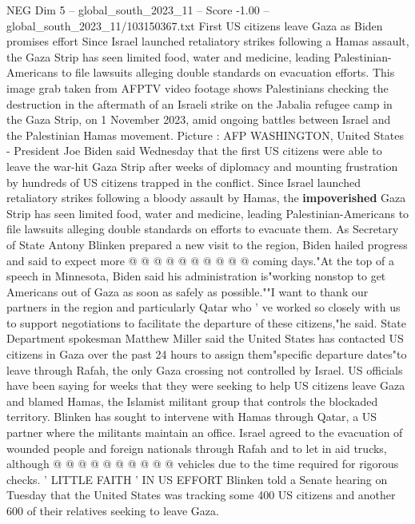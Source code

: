 \begin{textsample}{NEG Dim 5 – global\_south\_2023\_11 – Score -1.00 – global\_south\_2023\_11/103150367.txt}  \label{ex:f5_neg_203}
First US citizens leave Gaza as Biden promises effort Since Israel launched retaliatory strikes following a Hamas assault, the Gaza Strip has seen limited food, water and medicine, leading Palestinian-Americans to file lawsuits alleging double standards on evacuation efforts.
This image grab taken from AFPTV video footage shows Palestinians checking the destruction in the aftermath of an Israeli strike on the Jabalia refugee camp in the Gaza Strip, on 1 November 2023, amid ongoing battles between Israel and the Palestinian Hamas movement.
Picture : AFP WASHINGTON, United States - President Joe Biden said Wednesday that the first US citizens were able to leave the war-hit Gaza Strip after weeks of diplomacy and mounting frustration by hundreds of US citizens trapped in the conflict.
Since Israel launched retaliatory strikes following a bloody assault by Hamas, the \textbf{impoverished} Gaza Strip has seen limited food, water and medicine, leading Palestinian-Americans to file lawsuits alleging double standards on efforts to evacuate them.
As Secretary of State Antony Blinken prepared a new visit to the region, Biden hailed progress and said to expect more @ @ @ @ @ @ @ @ @ @ coming days."At the top of a speech in Minnesota, Biden said his administration is"working nonstop to get Americans out of Gaza as soon as safely as possible.""I want to thank our partners in the region and particularly Qatar who ' ve worked so closely with us to support negotiations to facilitate the departure of these citizens,"he said.
State Department spokesman Matthew Miller said the United States has contacted US citizens in Gaza over the past 24 hours to assign them"specific departure dates"to leave through Rafah, the only Gaza crossing not controlled by Israel.
US officials have been saying for weeks that they were seeking to help US citizens leave Gaza and blamed Hamas, the Islamist militant group that controls the blockaded territory.
Blinken has sought to intervene with Hamas through Qatar, a US partner where the militants maintain an office.
Israel agreed to the evacuation of wounded people and foreign nationals through Rafah and to let in aid trucks, although @ @ @ @ @ @ @ @ @ @ vehicles due to the time required for rigorous checks. ' LITTLE FAITH ' IN US EFFORT Blinken told a Senate hearing on Tuesday that the United States was tracking some 400 US citizens and another 600 of their relatives seeking to leave Gaza.

\end{textsample}
